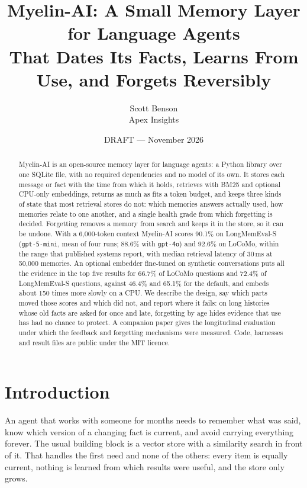 \documentclass[11pt]{article}
\title{Myelin-AI: A Small Memory Layer for Language Agents\\
That Dates Its Facts, Learns From Use, and Forgets Reversibly}
\author{Scott Benson\\Apex Insights}
\date{DRAFT --- November 2026}
\begin{document}
\maketitle

\begin{abstract}
\mbox{Myelin-AI} is an open-source memory layer for language agents: a Python
library over one SQLite file, with no required dependencies and no
model of its own. It stores each message or fact with the time from
which it holds, retrieves with BM25 and optional CPU-only embeddings,
returns as much as fits a token budget, and keeps three kinds of state
that most retrieval stores do not: which memories answers actually
used, how memories relate to one another, and a single health grade
from which forgetting is decided. Forgetting removes a memory from
search and keeps it in the store, so it can be undone. With a
6{,}000-token context \mbox{Myelin-AI} scores 90.1\% on LongMemEval-S
(\texttt{gpt-5-mini}, mean of four runs; 88.6\% with \texttt{gpt-4o})
and 92.6\% on LoCoMo, within the range that published systems report,
with median retrieval latency of 30\,ms at 50{,}000 memories. An
optional embedder fine-tuned on synthetic conversations puts all the
evidence in the top five results for 66.7\% of LoCoMo questions and
72.4\% of LongMemEval-S questions, against 46.4\% and 65.1\% for the
default, and embeds about 150 times more slowly on a CPU. We
describe the design, say which parts moved those scores and which did
not, and report where it fails: on long histories whose old facts are
asked for once and late, forgetting by age hides evidence that use has
had no chance to protect. A companion paper gives the longitudinal
evaluation under which the feedback and forgetting mechanisms were
measured. Code, harnesses and result files are public under the MIT
licence.
\end{abstract}

\section{Introduction}

An agent that works with someone for months needs to remember what was
said, know which version of a changing fact is current, and avoid
carrying everything forever. The usual building block is a vector
store with a similarity search in front of it. That handles the first
need and none of the others: every item is equally current, nothing is
learned from which results were useful, and the store only grows.
\end{document}
